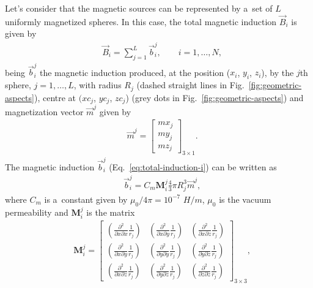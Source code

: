 \documentclass[journal abbreviation, npg]{copernicus}
\begin{document}
Let's consider that the magnetic sources can be represented by a~set
of $L$ uniformly magnetized spheres. In this case, the total magnetic
induction $\vec{B}_i$ is given by
\begin{align}
 &
\vec{B}_i = \sum_{j = 1}^{L} \vec{b}_{i}^{j} , \qquad i = 1, \ldots, N ,
\label{eq:total-induction-i}
\end{align}
being $\vec{b}^{j}_{i}$ the magnetic induction produced, at the position
($x_{i}$, $y_{i}$, $z_{i}$), by the $j$th sphere, $j = 1, \ldots, L$, with
radius $R_ {j}$ (dashed straight lines in Fig.~\ref{fig:geometric-aspects}),
centre at $(xc_{j}$, $yc_{j}$, $zc_{j}$) (grey dots in
Fig.~\ref{fig:geometric-aspects}) and magnetization vector $\vec{m}^{j}$
given by
\begin{align}
 &
\vec{m}^{j} =
\begin{bmatrix}
mx_{j} \\
my_{j} \\
mz_{j}
\end{bmatrix}_ {3 \times 1} .
\label{eq:mag-vector-j}
\end{align}
The magnetic induction $\vec{b}^{j}_{i}$ (Eq.~\ref{eq:total-induction-i}) can
be written as
\begin{align}
 &
\vec{b}^{j}_{i} = C_{m}  \mathbf{M}_{i}^{j}
                  \frac{4}{3} \pi R_{j}^{3}
                  \vec{m}^{j} ,
\label{eq:j-induction-i}
\end{align}
where $C_{m}$ is a~constant given by $\mu_{0}/{4 \pi}=10^{-7}$ $H/m$,
$\mu_{0}$ is the vacuum permeability and $\mathbf{M}_{i}^{j}$ is the
matrix
\begin{align}
 &
\mathbf{M}^{j}_{i} =
\begin{bmatrix}
\left(\frac{\partial^{2}}{\partial x \partial x} \frac{1}{r_{j}} \right) &
\left(\frac{\partial^{2}}{\partial x \partial y} \frac{1}{r_{j}} \right) &
\left(\frac{\partial^{2}}{\partial x \partial z} \frac{1}{r_{j}} \right) \\[2mm]
\left(\frac{\partial^{2}}{\partial x \partial y} \frac{1}{r_{j}} \right) &
\left(\frac{\partial^{2}}{\partial y \partial y} \frac{1}{r_{j}} \right) &
\left(\frac{\partial^{2}}{\partial y \partial z} \frac{1}{r_{j}} \right) \\[2mm]
\left(\frac{\partial^{2}}{\partial x \partial z} \frac{1}{r_{j}} \right) &
\left(\frac{\partial^{2}}{\partial y \partial z} \frac{1}{r_{j}} \right) &
\left(\frac{\partial^{2}}{\partial z \partial z} \frac{1}{r_{j}} \right)
\end{bmatrix}_{3 \times 3} ,
\label{eq:matrix-Mij}
\end{align}
\end{document}
